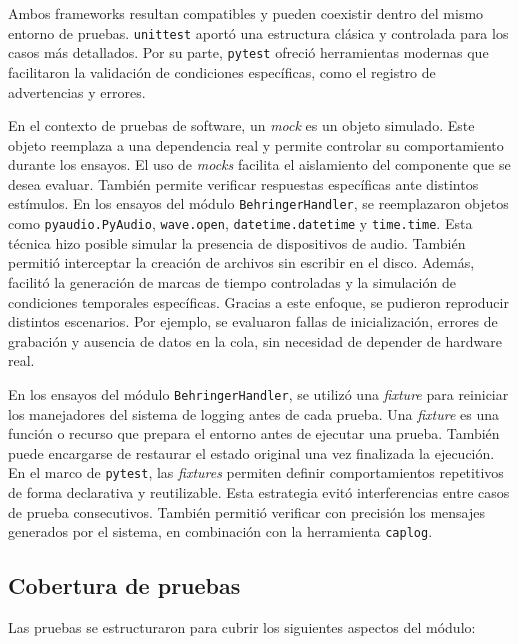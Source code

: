 Ambos frameworks resultan compatibles y pueden coexistir dentro del mismo entorno de pruebas. \texttt{unittest} aportó una estructura clásica y controlada para los casos más detallados. Por su parte, \texttt{pytest} ofreció herramientas modernas que facilitaron la validación de condiciones específicas, como el registro de advertencias y errores.

En el contexto de pruebas de software, un \textit{mock} es un objeto simulado. Este objeto reemplaza a una dependencia real y permite controlar su comportamiento durante los ensayos. El uso de \textit{mocks} facilita el aislamiento del componente que se desea evaluar. También permite verificar respuestas específicas ante distintos estímulos. En los ensayos del módulo \texttt{BehringerHandler}, se reemplazaron objetos como \texttt{pyaudio.PyAudio}, \texttt{wave.open}, \texttt{datetime.datetime} y \texttt{time.time}. Esta técnica hizo posible simular la presencia de dispositivos de audio. También permitió interceptar la creación de archivos sin escribir en el disco. Además, facilitó la generación de marcas de tiempo controladas y la simulación de condiciones temporales específicas. Gracias a este enfoque, se pudieron reproducir distintos escenarios. Por ejemplo, se evaluaron fallas de inicialización, errores de grabación y ausencia de datos en la cola, sin necesidad de depender de hardware real.

En los ensayos del módulo \texttt{BehringerHandler}, se utilizó una \textit{fixture} para reiniciar los manejadores del sistema de logging antes de cada prueba.  Una \textit{fixture} es una función o recurso que prepara el entorno antes de ejecutar una prueba. También puede encargarse de restaurar el estado original una vez finalizada la ejecución. En el marco de \texttt{pytest}, las \textit{fixtures} permiten definir comportamientos repetitivos de forma declarativa y reutilizable.  Esta estrategia evitó interferencias entre casos de prueba consecutivos. También permitió verificar con precisión los mensajes generados por el sistema, en combinación con la herramienta \texttt{caplog}.

\subsection{Cobertura de pruebas}

Las pruebas se estructuraron para cubrir los siguientes aspectos del módulo:


